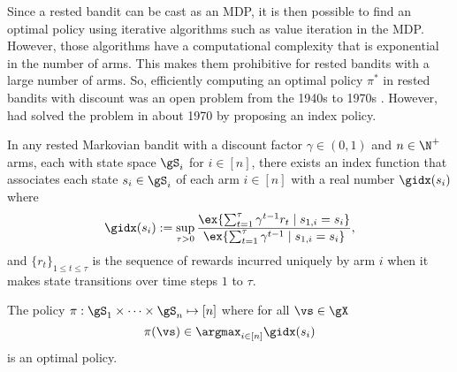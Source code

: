 Since a rested bandit can be cast as an MDP, it is then possible to find an optimal policy using iterative algorithms such as value iteration in the MDP.
However, those algorithms have a computational complexity that is exponential in the number of arms.
This makes them prohibitive for rested bandits with a large number of arms.
So, efficiently computing an optimal policy $\pi^*$ in rested bandits with discount was an open problem from the 1940s to 1970s \cite{whittle1996optimal}.
However, \cite{gittins1979bandit} had solved the problem in about 1970 by proposing an index policy.
\begin{prop}
    \label{ch:mb:prop:gidx_defn}
    In any rested Markovian bandit with a discount factor $\gamma\in(0,1)$ and $n\in\N^+$ arms, each with state space $\gS_i$ for $i\in[n]$, there exists an index function that associates each state $s_i\in\gS_i$ of each arm $i\in[n]$ with a real number $\gidx(s_i)$ where
    \begin{equation}
        \label{ch:mb:eq:gidx_defn}
        \gidx(s_i):=\sup_{\tau>0}\frac{\ex{\sum_{t=1}^{\tau}\gamma^{t-1}r_t \mid s_{1,i}=s_i}}{\ex{\sum_{t=1}^{\tau}\gamma^{t-1}\mid s_{1,i}=s_i}}, 
    \end{equation}
    and $\{r_t\}_{1\le t\le\tau}$ is the sequence of rewards incurred uniquely by arm $i$ when it makes state transitions over time steps $1$ to $\tau$.

    The policy $\pi:\gS_1\times\dots\times\gS_n\mapsto[n]$ where for all $\vs\in\gX$
    \begin{equation*}
        \pi(\vs)\in\argmax_{i\in[n]}\gidx(s_i)
    \end{equation*} is an optimal policy.
\end{prop}
